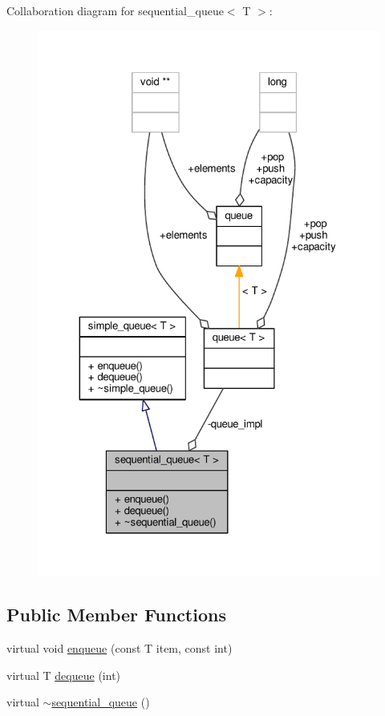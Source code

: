 Collaboration diagram for sequential\-\_\-queue$<$ T $>$\-:
\nopagebreak
\begin{figure}[H]
\begin{center}
\leavevmode
\includegraphics[width=325pt]{classsequential__queue__coll__graph}
\end{center}
\end{figure}
\subsection*{Public Member Functions}
\begin{DoxyCompactItemize}
\item 
virtual void \hyperlink{classsequential__queue_a90580473e63246c11c7b40d017e23bc2}{enqueue} (const T item, const int)
\item 
virtual T \hyperlink{classsequential__queue_a57a326493dbe3be01332fb4e083f29f5}{dequeue} (int)
\item 
virtual \hyperlink{classsequential__queue_a070ade84ea04f5a36b412eb723fba476}{$\sim$sequential\-\_\-queue} ()
\end{DoxyCompactItemize}
